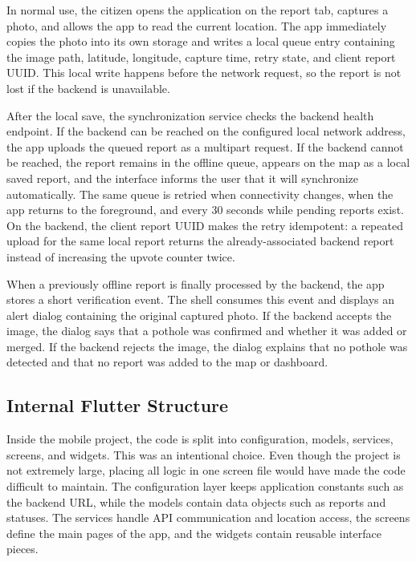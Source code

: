 In normal use, the citizen opens the application on the report tab, captures a photo, and allows the app to read the current location. The app immediately copies the photo into its own storage and writes a local queue entry containing the image path, latitude, longitude, capture time, retry state, and client report UUID. This local write happens before the network request, so the report is not lost if the backend is unavailable.

After the local save, the synchronization service checks the backend health endpoint. If the backend can be reached on the configured local network address, the app uploads the queued report as a multipart request. If the backend cannot be reached, the report remains in the offline queue, appears on the map as a local saved report, and the interface informs the user that it will synchronize automatically. The same queue is retried when connectivity changes, when the app returns to the foreground, and every 30 seconds while pending reports exist. On the backend, the client report UUID makes the retry idempotent: a repeated upload for the same local report returns the already-associated backend report instead of increasing the upvote counter twice.

When a previously offline report is finally processed by the backend, the app stores a short verification event. The shell consumes this event and displays an alert dialog containing the original captured photo. If the backend accepts the image, the dialog says that a pothole was confirmed and whether it was added or merged. If the backend rejects the image, the dialog explains that no pothole was detected and that no report was added to the map or dashboard.

\subsection{Internal Flutter Structure}

Inside the mobile project, the code is split into configuration, models, services, screens, and widgets. This was an intentional choice. Even though the project is not extremely large, placing all logic in one screen file would have made the code difficult to maintain. The configuration layer keeps application constants such as the backend URL, while the models contain data objects such as reports and statuses. The services handle API communication and location access, the screens define the main pages of the app, and the widgets contain reusable interface pieces.

